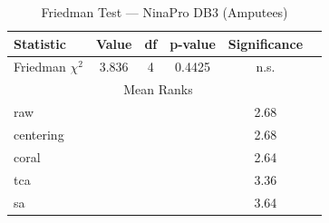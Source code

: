 \begin{table}[htbp]
\centering
\caption{Friedman Test — NinaPro DB3 (Amputees)}
\label{tab:friedman_db3}
\begin{tabular}{lccccc}
\toprule
Statistic & Value & df & p-value & Significance \\
\midrule
Friedman $\chi^2$ & 3.836 & 4 & 0.4425 & n.s. \\
\midrule
\multicolumn{5}{c}{Mean Ranks} \\
\midrule
raw & & & & 2.68 \\
centering & & & & 2.68 \\
coral & & & & 2.64 \\
tca & & & & 3.36 \\
sa & & & & 3.64 \\
\bottomrule
\end{tabular}
\end{table}